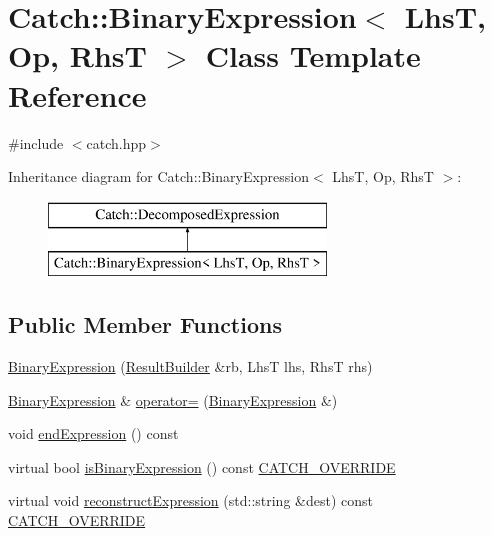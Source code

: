 \hypertarget{class_catch_1_1_binary_expression}{}\section{Catch\+:\+:Binary\+Expression$<$ LhsT, Op, RhsT $>$ Class Template Reference}
\label{class_catch_1_1_binary_expression}


{\ttfamily \#include $<$catch.\+hpp$>$}

Inheritance diagram for Catch\+:\+:Binary\+Expression$<$ LhsT, Op, RhsT $>$\+:\begin{figure}[H]
\begin{center}
\leavevmode
\includegraphics[height=2.000000cm]{class_catch_1_1_binary_expression}
\end{center}
\end{figure}
\subsection*{Public Member Functions}
\begin{DoxyCompactItemize}
\item 
\mbox{\hyperlink{class_catch_1_1_binary_expression_a0d81384761aba5f7a6d5f4fc7e7944f3}{Binary\+Expression}} (\mbox{\hyperlink{class_catch_1_1_result_builder}{Result\+Builder}} \&rb, LhsT lhs, RhsT rhs)
\item 
\mbox{\hyperlink{class_catch_1_1_binary_expression}{Binary\+Expression}} \& \mbox{\hyperlink{class_catch_1_1_binary_expression_a2147a858eb5866e5643d0ef321064aa1}{operator=}} (\mbox{\hyperlink{class_catch_1_1_binary_expression}{Binary\+Expression}} \&)
\item 
void \mbox{\hyperlink{class_catch_1_1_binary_expression_aa1dba7f316f70902859b8eab27692dfb}{end\+Expression}} () const
\item 
virtual bool \mbox{\hyperlink{class_catch_1_1_binary_expression_a4c617c0b6a73a9cafbbf900909c7c258}{is\+Binary\+Expression}} () const \mbox{\hyperlink{catch_8hpp_a8ecdce4d3f57835f707915ae831eb847}{C\+A\+T\+C\+H\+\_\+\+O\+V\+E\+R\+R\+I\+DE}}
\item 
virtual void \mbox{\hyperlink{class_catch_1_1_binary_expression_a6ed73ff9af9c229f9fa3d35d019f9e37}{reconstruct\+Expression}} (std\+::string \&dest) const \mbox{\hyperlink{catch_8hpp_a8ecdce4d3f57835f707915ae831eb847}{C\+A\+T\+C\+H\+\_\+\+O\+V\+E\+R\+R\+I\+DE}}
\end{DoxyCompactItemize}


